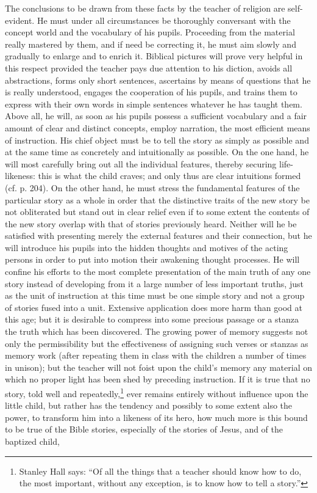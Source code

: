 The conclusions to be drawn from these facts by the teacher of religion are self-evident. He must under all circumstances be thoroughly conversant with the concept world and the vocabulary of his pupils. Proceeding from the material really mastered by them, and if need be correcting it, he must aim slowly and gradually to enlarge and to enrich it. Biblical pictures will prove very helpful in this respect provided the teacher pays due attention to his diction, avoids all abstractions, forms only short sentences, ascertains by means of questions that he is really understood, engages the cooperation of his pupils, and trains them to express with their own words in simple sentences whatever he has taught them. Above all, he will, as soon as his pupils possess a sufficient vocabulary and a fair amount of clear and distinct concepts, employ narration, the most efficient means of instruction. His chief object must be to tell the story as simply as possible and at the same time as concretely and intuitionally as
possible. On the one hand, he will most carefully bring out all the individual features, thereby securing life-likeness: this is what the child craves; and only thus are clear intuitions formed (cf. p. 204). On the other hand, he must stress the fundamental features of the particular story as a whole in order that the distinctive traits of the new story be not obliterated but stand out in clear relief even if to some extent the contents of the new story overlap with that of stories previously heard. Neither will he be satisfied with presenting merely the external features and their connection, but he will introduce his pupils into the hidden thoughts and motives of the acting persons in order to put into motion their awakening thought processes. He will confine his efforts to the most complete presentation of the main truth of any one story instead of developing from it a large number of less important truths, just as the unit of instruction at this time must be one simple story and not a group of stories fused into a unit. Extensive application does more harm than good at this age; but it is desirable to compress into some precious passage or a stanza the truth which has been discovered. The growing power of memory suggests not only the permissibility but the effectiveness of assigning such verses or stanzas as memory work (after repeating them in class with the children a number of times in unison); but the teacher will not foist upon the child's memory any material on which no proper light has been shed by preceding instruction. If it is true that no story, told well and repeatedly,\footnote{Stanley Hall says: “Of all the things that a teacher should know how to do, the most important, without any exception, is to know how to tell a story.”} ever remains entirely without influence upon the little child, but rather has the tendency and possibly to some extent also the power, to transform him into a likeness of its hero, how much more is this bound to be true of the Bible stories, especially of the stories of Jesus, and of the baptized child,
